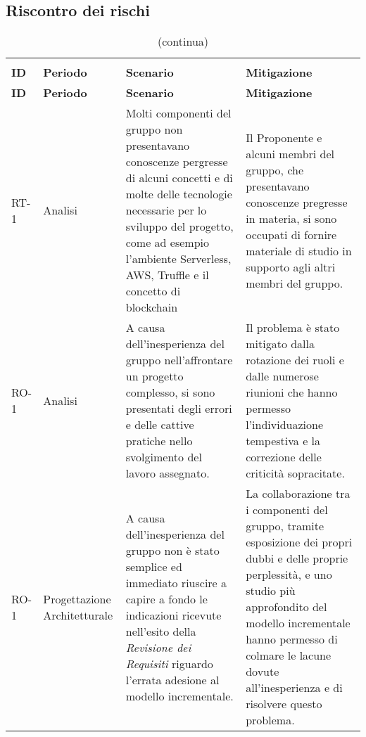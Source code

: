 \begin{appendices}
\section{Riscontro dei rischi}
	\begin{longtable}{
		>{\centering}p{}
		>{\centering}p{}
		>{\centering\arraybackslash}p{}
		>{\centering\arraybackslash}p{} }

		\rowcolor{white}\caption {Riscontro dei rischi} \\

		\textbf{\color{white}ID} &
		\textbf{\color{white}Periodo} &
		\textbf{\color{white}Scenario} &
		\textbf{\color{white}Mitigazione}
		\endfirsthead
		
		\rowcolor{white}\caption[]{(continua)}\\
		\textbf{\color{white}ID} &
		\textbf{\color{white}Periodo} &
		\textbf{\color{white}Scenario} &
		\textbf{\color{white}Mitigazione}
		\endhead
		
		\hline \multicolumn{4}{c}{\textit{Continua nella prossima pagina}} \\
		\endfoot
		\hline
		\endlastfoot

		RT-1
		&
		Analisi
		&
		Molti componenti del gruppo \Gruppo{} non presentavano conoscenze pergresse di alcuni concetti e di molte delle tecnologie necessarie per lo sviluppo del progetto, come ad esempio l'ambiente Serverless\ped{\textit{G}}, AWS\ped{\textit{G}}, Truffle\ped{\textit{G}} e il concetto di blockchain\ped{\textit{G}}
		&
		Il Proponente\ped{\textit{G}} e alcuni membri del gruppo, che presentavano conoscenze pregresse in materia, si sono occupati di fornire materiale di studio in supporto agli altri membri del gruppo.\\

		RO-1
		&
		Analisi
		&
		A causa dell'inesperienza del gruppo nell'affrontare un progetto complesso, si sono presentati degli errori e delle cattive pratiche nello svolgimento del lavoro assegnato.
		&
		Il problema è stato mitigato dalla rotazione dei ruoli e dalle numerose riunioni che hanno permesso l'individuazione tempestiva e la correzione delle criticità sopracitate.\\
		
		RO-1
		&
		Progettazione Architetturale
		&
		A causa dell'inesperienza del gruppo non è stato semplice ed immediato riuscire a capire a fondo le indicazioni ricevute nell'esito della \textit{Revisione dei Requisiti} riguardo l'errata adesione al modello incrementale.
		&
		La collaborazione tra i componenti del gruppo, tramite esposizione dei propri dubbi e delle proprie perplessità, e uno studio più approfondito del modello incrementale hanno permesso di colmare le lacune dovute all'inesperienza e di risolvere questo problema.\\
		

\end{longtable}
\end{appendices}
